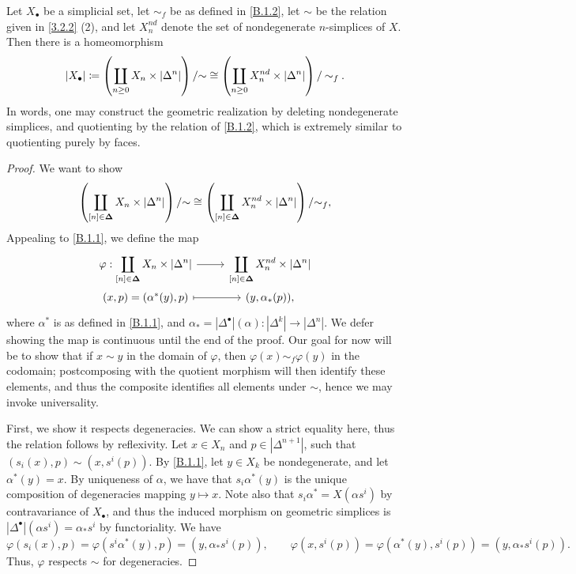 \begin{proposition}[Prop. 3.3.7]\label{B.1.3}
	Let $X_{\bullet} $ be a simplicial set, let $\sim_f$ be as defined in \cref{B.1.2}, let $\sim $ be the relation given in \cref{3.2.2} (2), and let $X_n^{nd} $ denote the set of nondegenerate $n$-simplices of $X$. Then there is a homeomorphism
	\[
		\left| X_{\bullet}  \right| \coloneqq \left( \coprod_{n\geq 0} X_n\times \left| \Delta^n \right|  \right) /\mathbin{\sim} \cong \left( \coprod_{n\geq 0} X_n^{nd} \times \left| \Delta^n \right|  \right) /\mathbin{\sim} _f
	.\]
	In words, one may construct the geometric realization by deleting nondegenerate simplices, and quotienting by the relation of \cref{B.1.2}, which is extremely similar to quotienting purely by faces.
\end{proposition}
\begin{proof}
	We want to show
	\[
		\left( \coprod_{[n]\in\boldsymbol{\Delta} } X_n\times \left| \Delta^n \right|  \right) /\mathbin{\sim} \cong \left( \coprod_{[n]\in\boldsymbol{\Delta} } X_n^{nd} \times \left| \Delta^n \right|  \right) /\mathbin{\sim}_f ,
	\]
	Appealing to \cref{B.1.1}, we define the map
	\[\begin{tikzcd}[row sep = 0em, column sep = 2.5em]
		\varphi  : \displaystyle{\coprod_{[n]\in\boldsymbol{\Delta} } X_n\times \left| \Delta^n \right| }\ar[r]  & \displaystyle{\coprod_{[n]\in\boldsymbol{\Delta} } X_n^{nd} \times \left| \Delta^n \right|} \\
		(x,p)=(\alpha^*(y),p)\ar[mapsto, r]  & {(y,\alpha_*(p))},
	\end{tikzcd}\]
	where $\alpha^*$ is as defined in \cref{B.1.1}, and $\alpha_*=\left| \Delta^{\bullet}  \right| (\alpha): \left| \Delta^k \right|  \to \left| \Delta^n \right| $. We defer showing the map is continuous until the end of the proof. Our goal for now will be to show that if $x\sim y$ in the domain of $\varphi$, then $\varphi(x)\sim _f\varphi(y)$ in the codomain; postcomposing with the quotient morphism will then identify these elements, and thus the composite identifies all elements under $\sim $, hence we may invoke universality.

	First, we show it respects degeneracies. We can show a strict equality here, thus the relation follows by reflexivity. Let $x\in X_n$ and $p\in\left| \Delta^{n+1}  \right| $, such that $(s_i(x),p)\sim (x,s^i(p))$. By \cref{B.1.1}, let $y\in X_k$ be nondegenerate, and let $\alpha^*(y)=x$. By uniqueness of $\alpha$, we have that $s_i\alpha^*(y)$ is the unique composition of degeneracies mapping $y\mapsto x$. Note also that $s_i\alpha^*=X(\alpha s^i)$ by contravariance of $X_{\bullet} $, and thus the induced morphism on geometric simplices is $\left| \Delta^{\bullet}  \right| (\alpha s^i)=\alpha_*s^i$ by functoriality. We have
	\[
		\varphi(s_i(x),p)=\varphi(s^i\alpha^*(y),p)=(y,\alpha_*s^i(p)),\qquad\varphi(x,s^i(p))=\varphi(\alpha^*(y),s^i(p))=(y,\alpha_*s^i(p))
	.\]
	Thus, $\varphi$ respects $\sim $ for degeneracies.


\end{proof}
